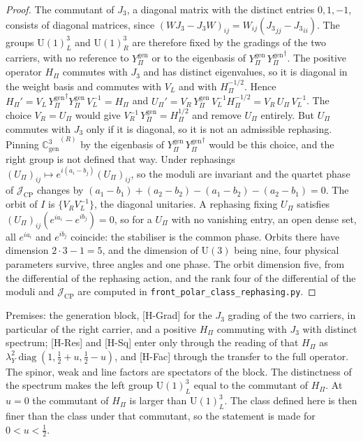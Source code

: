 \documentclass[11pt]{article}
\theoremstyle{definition}
\theoremstyle{remark}
\newcommand{\Jthree}{J_{3}}
\newcommand{\Cgen}{\mathbb{C}^{3}_{\mathrm{gen}}}
\newcommand{\GR}{{\Cgen}^{(R)}}
\newcommand{\Ygen}{{Y^{\mathrm{gen}}_{\Pi}}}
\newcommand{\JCP}{\mathcal{J}_{\mathrm{CP}}}
\newcommand{\Hpi}{H_{\Pi}}
\newcommand{\Upi}{U_{\Pi}}
\newcommand{\lamY}{\lambda_{Y}}
\newcommand{\UU}{\mathrm{U}}
\newcommand{\diag}{\operatorname{diag}}
\begin{document}
    \begin{proof}
      The commutant of $\Jthree$, a diagonal matrix with the distinct entries $0, 1, -1$, consists of diagonal
      matrices, since $(W\Jthree - \Jthree W)_{ij} = W_{ij}({\Jthree}_{jj} - {\Jthree}_{ii})$.
      The groups $\UU(1)^{3}_{L}$ and $\UU(1)^{3}_{R}$ are therefore fixed by the gradings of the two carriers, with
      no reference to $\Ygen$ or to the eigenbasis of $\Ygen\,\Ygen^{\dagger}$.
      The positive operator $\Hpi$ commutes with $\Jthree$ and has distinct eigenvalues, so it is diagonal in the weight
      basis and commutes with $V_{L}$ and with $\Hpi^{-1/2}$.
      Hence $\Hpi' = V_{L}\,\Ygen^{\dagger}\Ygen\,V_{L}^{-1} = \Hpi$ and
      $\Upi' = V_{R}\,\Ygen\,V_{L}^{-1}\Hpi^{-1/2} = V_{R}\,\Upi\,V_{L}^{-1}$.
      The choice $V_{R} = \Upi$ would give $V_{R}^{-1}\,\Ygen = \Hpi^{1/2}$ and remove $\Upi$ entirely.
      But $\Upi$ commutes with $\Jthree$ only if it is diagonal, so it is not an admissible rephasing.
      Pinning $\GR$ by the eigenbasis of $\Ygen\,\Ygen^{\dagger}$ would be this choice, and the right group is not
      defined that way.
      Under rephasings $(\Upi)_{ij} \mapsto e^{i(a_{i} - b_{j})}(\Upi)_{ij}$, so the moduli are invariant and the
      quartet phase of $\JCP$ changes by $(a_{1} - b_{1}) + (a_{2} - b_{2}) - (a_{1} - b_{2}) - (a_{2} - b_{1}) = 0$.
      The orbit of $I$ is $\{V_{R}V_{L}^{-1}\}$, the diagonal unitaries.
      A rephasing fixing $\Upi$ satisfies $(\Upi)_{ij}(e^{ia_{i}} - e^{ib_{j}}) = 0$, so for a $\Upi$ with no vanishing
      entry, an open dense set, all $e^{ia_{i}}$ and $e^{ib_{j}}$ coincide: the stabiliser is the common phase.
      Orbits there have dimension $2\cdot 3 - 1 = 5$, and the dimension of $\UU(3)$ being nine, four physical parameters
      survive, three angles and one phase.
      The orbit dimension five, from the differential of the rephasing action, and the rank four of the differential of
      the moduli and $\JCP$ are computed in \texttt{front\_polar\_class\_rephasing.py}.
    \end{proof}

    Premises: the generation block, [H-Grad] for the $\Jthree$ grading of the two carriers, in particular of the right
    carrier, and a positive $\Hpi$ commuting with $\Jthree$ with distinct spectrum; [H-Res] and [H-Sq] enter only
    through the reading of that
    $\Hpi$ as $\lamY^{2}\diag(1, \tfrac12 + u, \tfrac12 - u)$, and [H-Fac] through the transfer to the full operator.
    The spinor, weak and line factors are spectators of the block.
    The distinctness of the spectrum makes the left group $\UU(1)^{3}_{L}$ equal to the commutant of $\Hpi$.
    At $u = 0$ the commutant of $\Hpi$ is larger than $\UU(1)^{3}_{L}$.
    The class defined here is then finer than the class under that commutant, so the statement is made for
    $0 < u < \tfrac12$.
\end{document}
